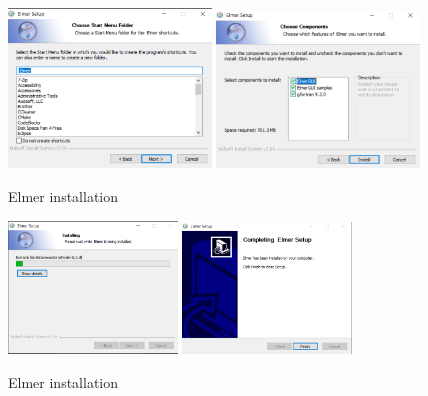 \begin{figure}[H]
\begin{center}
\includegraphics[width=0.48\textwidth]{installer-7}
\includegraphics[width=0.48\textwidth]{installer-8}
\caption{Elmer installation}\label{fg:installer-7}
\end{center}
\end{figure}

\begin{figure}[H]
\begin{center}
\includegraphics[width=0.4\textwidth]{installer-9}
\includegraphics[width=0.4\textwidth]{installer-10}
\caption{Elmer installation}\label{fg:installer-9}
\end{center}
\end{figure}

